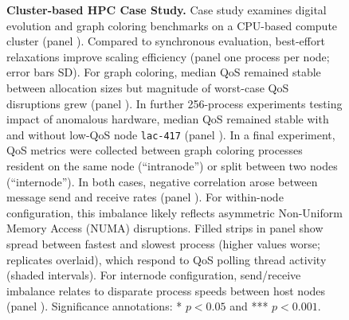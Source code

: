 \begin{figure}
\caption{
\textbf{Cluster-based HPC Case Study.}
\footnotesize
Case study examines digital evolution and graph coloring benchmarks on a CPU-based compute cluster (panel ).
Compared to synchronous evaluation, best-effort relaxations improve scaling efficiency (panel  one process per node; error bars SD).
For graph coloring, median QoS remained stable between allocation sizes but magnitude of worst-case QoS disruptions grew (panel ).
In further 256-process experiments testing impact of anomalous hardware, median QoS remained stable with and without low-QoS node \texttt{lac-417} (panel ).
In a final experiment, QoS metrics were collected between graph coloring processes resident on the same node (``intranode'') or split between two nodes (``internode'').
In both cases, negative correlation arose between message send and receive rates (panel ).
For within-node configuration, this imbalance likely reflects asymmetric Non-Uniform Memory Access (NUMA) disruptions.
Filled strips in panel  show spread between fastest and slowest process (higher values worse; replicates overlaid), which respond to QoS polling thread activity (shaded intervals).
For internode configuration, send/receive imbalance relates to disparate process speeds between host nodes (panel ).
Significance annotations: * $p<0.05$ and *** $p < 0.001$.
}
\label{moreno:fig:cpu}
\end{figure}
